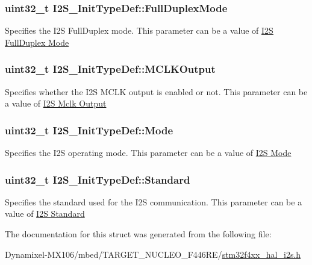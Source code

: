 \subsubsection[{\texorpdfstring{Full\+Duplex\+Mode}{FullDuplexMode}}]{\setlength{\rightskip}{0pt plus 5cm}uint32\+\_\+t I2\+S\+\_\+\+Init\+Type\+Def\+::\+Full\+Duplex\+Mode}\hypertarget{struct_i2_s___init_type_def_a3126fcf92721ac72c91cc870fcef1ffe}{}\label{struct_i2_s___init_type_def_a3126fcf92721ac72c91cc870fcef1ffe}
Specifies the I2S Full\+Duplex mode. This parameter can be a value of \hyperlink{group___i2_s___full_duplex___mode}{I2S Full\+Duplex Mode} 
\subsubsection[{\texorpdfstring{M\+C\+L\+K\+Output}{MCLKOutput}}]{\setlength{\rightskip}{0pt plus 5cm}uint32\+\_\+t I2\+S\+\_\+\+Init\+Type\+Def\+::\+M\+C\+L\+K\+Output}\hypertarget{struct_i2_s___init_type_def_ad0d868889f53bdda32fa5c201efa2a12}{}\label{struct_i2_s___init_type_def_ad0d868889f53bdda32fa5c201efa2a12}
Specifies whether the I2S M\+C\+LK output is enabled or not. This parameter can be a value of \hyperlink{group___i2_s___m_c_l_k___output}{I2S Mclk Output} 
\subsubsection[{\texorpdfstring{Mode}{Mode}}]{\setlength{\rightskip}{0pt plus 5cm}uint32\+\_\+t I2\+S\+\_\+\+Init\+Type\+Def\+::\+Mode}\hypertarget{struct_i2_s___init_type_def_abcd2a46537eee4ed23fa1642c5234ea8}{}\label{struct_i2_s___init_type_def_abcd2a46537eee4ed23fa1642c5234ea8}
Specifies the I2S operating mode. This parameter can be a value of \hyperlink{group___i2_s___mode}{I2S Mode} 
\subsubsection[{\texorpdfstring{Standard}{Standard}}]{\setlength{\rightskip}{0pt plus 5cm}uint32\+\_\+t I2\+S\+\_\+\+Init\+Type\+Def\+::\+Standard}\hypertarget{struct_i2_s___init_type_def_a8fc84bad7ae403ab4231b37077f9d99f}{}\label{struct_i2_s___init_type_def_a8fc84bad7ae403ab4231b37077f9d99f}
Specifies the standard used for the I2S communication. This parameter can be a value of \hyperlink{group___i2_s___standard}{I2S Standard} 

The documentation for this struct was generated from the following file\+:\begin{DoxyCompactItemize}
\item 
Dynamixel-\/\+M\+X106/mbed/\+T\+A\+R\+G\+E\+T\+\_\+\+N\+U\+C\+L\+E\+O\+\_\+\+F446\+R\+E/\hyperlink{stm32f4xx__hal__i2s_8h}{stm32f4xx\+\_\+hal\+\_\+i2s.\+h}\end{DoxyCompactItemize}
